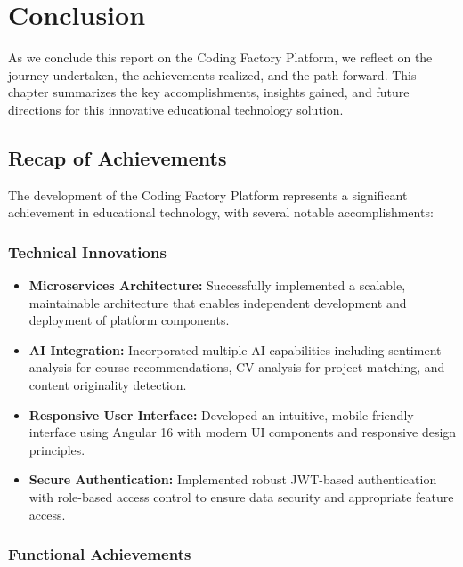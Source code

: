 \documentclass[12pt,a4paper]{report}
\begin{document}
\chapter{Conclusion}

As we conclude this report on the Coding Factory Platform, we reflect on the journey undertaken, the achievements realized, and the path forward. This chapter summarizes the key accomplishments, insights gained, and future directions for this innovative educational technology solution.

\section{Recap of Achievements}

The development of the Coding Factory Platform represents a significant achievement in educational technology, with several notable accomplishments:

\subsection{Technical Innovations}

\begin{itemize}
    \item \textbf{Microservices Architecture:} Successfully implemented a scalable, maintainable architecture that enables independent development and deployment of platform components.

    \item \textbf{AI Integration:} Incorporated multiple AI capabilities including sentiment analysis for course recommendations, CV analysis for project matching, and content originality detection.

    \item \textbf{Responsive User Interface:} Developed an intuitive, mobile-friendly interface using Angular 16 with modern UI components and responsive design principles.

    \item \textbf{Secure Authentication:} Implemented robust JWT-based authentication with role-based access control to ensure data security and appropriate feature access.
\end{itemize}

\subsection{Functional Achievements}
\end{document}
